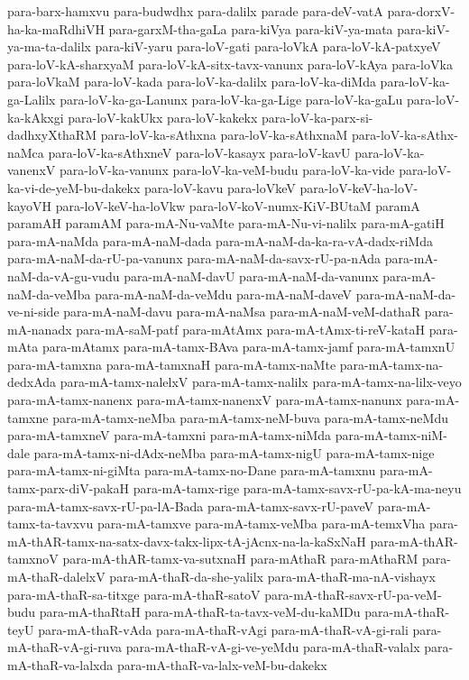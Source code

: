 {para-barx-hamxvu
para-budwdhx
para-dalilx
parade
para-deV-vatA
para-dorxV-ha-ka-maRdhiVH
para-garxM-tha-gaLa
para-kiVya
para-kiV-ya-mata
para-kiV-ya-ma-ta-dalilx
para-kiV-yaru
para-loV-gati
para-loVkA
para-loV-kA-patxyeV
para-loV-kA-sharxyaM
para-loV-kA-sitx-tavx-vanunx
para-loV-kAya
para-loVka
para-loVkaM
para-loV-kada
para-loV-ka-dalilx
para-loV-ka-diMda
para-loV-ka-ga-Lalilx
para-loV-ka-ga-Lanunx
para-loV-ka-ga-Lige
para-loV-ka-gaLu
para-loV-ka-kAkxgi
para-loV-kakUkx
para-loV-kakekx
para-loV-ka-parx-si-dadhxyXthaRM
para-loV-ka-sAthxna
para-loV-ka-sAthxnaM
para-loV-ka-sAthx-naMca
para-loV-ka-sAthxneV
para-loV-kasayx
para-loV-kavU
para-loV-ka-vanenxV
para-loV-ka-vanunx
para-loV-ka-veM-budu
para-loV-ka-vide
para-loV-ka-vi-de-yeM-bu-dakekx
para-loV-kavu
para-loVkeV
para-loV-keV-ha-loV-kayoVH
para-loV-keV-ha-loVkw
para-loV-koV-numx-KiV-BUtaM
paramA
paramAH
paramAM
para-mA-Nu-vaMte
para-mA-Nu-vi-nalilx
para-mA-gatiH
para-mA-naMda
para-mA-naM-dada
para-mA-naM-da-ka-ra-vA-dadx-riMda
para-mA-naM-da-rU-pa-vanunx
para-mA-naM-da-savx-rU-pa-nAda
para-mA-naM-da-vA-gu-vudu
para-mA-naM-davU
para-mA-naM-da-vanunx
para-mA-naM-da-veMba
para-mA-naM-da-veMdu
para-mA-naM-daveV
para-mA-naM-da-ve-ni-side
para-mA-naM-davu
para-mA-naMsa
para-mA-naM-veM-dathaR
para-mA-nanadx
para-mA-saM-patf
para-mAtAmx
para-mA-tAmx-ti-reV-kataH
para-mAta
para-mAtamx
para-mA-tamx-BAva
para-mA-tamx-jamf
para-mA-tamxnU
para-mA-tamxna
para-mA-tamxnaH
para-mA-tamx-naMte
para-mA-tamx-na-dedxAda
para-mA-tamx-nalelxV
para-mA-tamx-nalilx
para-mA-tamx-na-lilx-veyo
para-mA-tamx-nanenx
para-mA-tamx-nanenxV
para-mA-tamx-nanunx
para-mA-tamxne
para-mA-tamx-neMba
para-mA-tamx-neM-buva
para-mA-tamx-neMdu
para-mA-tamxneV
para-mA-tamxni
para-mA-tamx-niMda
para-mA-tamx-niM-dale
para-mA-tamx-ni-dAdx-neMba
para-mA-tamx-nigU
para-mA-tamx-nige
para-mA-tamx-ni-giMta
para-mA-tamx-no-Dane
para-mA-tamxnu
para-mA-tamx-parx-diV-pakaH
para-mA-tamx-rige
para-mA-tamx-savx-rU-pa-kA-ma-neyu
para-mA-tamx-savx-rU-pa-lA-Bada
para-mA-tamx-savx-rU-paveV
para-mA-tamx-ta-tavxvu
para-mA-tamxve
para-mA-tamx-veMba
para-mA-temxVha
para-mA-thAR-tamx-na-satx-davx-takx-lipx-tA-jAcnx-na-la-kaSxNaH
para-mA-thAR-tamxnoV
para-mA-thAR-tamx-va-sutxnaH
para-mAthaR
para-mAthaRM
para-mA-thaR-dalelxV
para-mA-thaR-da-she-yalilx
para-mA-thaR-ma-nA-vishayx
para-mA-thaR-sa-titxge
para-mA-thaR-satoV
para-mA-thaR-savx-rU-pa-veM-budu
para-mA-thaRtaH
para-mA-thaR-ta-tavx-veM-du-kaMDu
para-mA-thaR-teyU
para-mA-thaR-vAda
para-mA-thaR-vAgi
para-mA-thaR-vA-gi-rali
para-mA-thaR-vA-gi-ruva
para-mA-thaR-vA-gi-ve-yeMdu
para-mA-thaR-valalx
para-mA-thaR-va-lalxda
para-mA-thaR-va-lalx-veM-bu-dakekx
}
